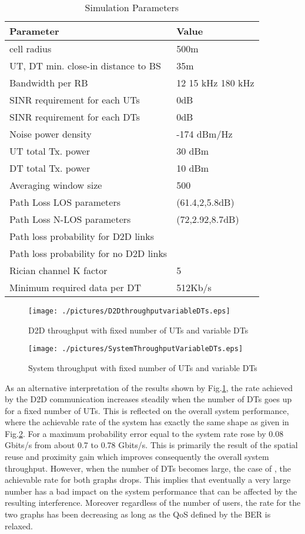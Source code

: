 \documentclass[conference,onecolumn,12pt]{IEEEtran}
\begin{document}
\begin{table}[!t]
\caption{Simulation Parameters} \label{SimulationParameters}
\centering
\begin{center}
\begin{tabular}{|M{5cm}|M{3cm}|}
\hline
\textbf{Parameter} &  \textbf{Value} \tabularnewline
\hline
    cell radius  & 500m \tabularnewline
\hline
   UT, DT min. close-in distance to BS & 35m  \tabularnewline
\hline
   Bandwidth per RB & 12  15 kHz  180 kHz \tabularnewline
\hline
   SINR requirement for each UTs   & 0dB \tabularnewline
\hline
   SINR requirement for each DTs   & 0dB \tabularnewline
\hline
   Noise power density & -174 dBm/Hz \tabularnewline
\hline
   UT total Tx. power   & 30 dBm \tabularnewline
\hline
   DT total Tx. power  & 10 dBm \tabularnewline
\hline
   Averaging window size   & 500 \tabularnewline
\hline
    Path Loss LOS  parameters &  (61.4,2,5.8dB)\tabularnewline
\hline
   Path Loss N-LOS  parameters & (72,2.92,8.7dB)\tabularnewline
\hline
   Path loss probability for D2D links &  \tabularnewline
\hline
   Path loss probability for no D2D links &  \tabularnewline
\hline
Rician channel K factor & 5 \tabularnewline
\hline
Minimum required data per DT & 512Kb/s \tabularnewline
\hline
\hline
\end{tabular}
\end{center}
\end{table}
\begin{figure}
\centering
\texttt{[image: ./pictures/D2DthroughputvariableDTs.eps]}
\caption{D2D throughput with fixed number of UTs and variable DTs }\label{D2DthroughputvariableDTs}
\end{figure}
\begin{figure}
\centering
\texttt{[image: ./pictures/SystemThroughputVariableDTs.eps]}
\caption{System throughput with fixed number of UTs and variable DTs }\label{SystemThroughputVariableDTs}
\end{figure}
As an alternative interpretation of the results shown by Fig.\ref{D2DthroughputvariableDTs}, the rate achieved by the D2D communication increases steadily when the number of DTs goes up for a fixed number of UTs. This is reflected on the overall system performance, where the achievable rate of the  system has exactly the same shape as given in Fig.\ref{SystemThroughputVariableDTs}. For a maximum probability error equal to  the system rate rose by 0.08 Gbits/s from about 0.7 to 0.78  Gbits/s. This is primarily the result of the spatial reuse and proximity gain which improves consequently the overall system throughput. However, when the number of DTs becomes large, the case of , the achievable rate for both graphs drops. This implies that eventually a very large number has a bad impact on the system performance that can be affected by the resulting interference. Moreover regardless of the number of users, the rate for the two graphs has been decreasing as long as the QoS defined by the BER is relaxed.\\
\end{document}
